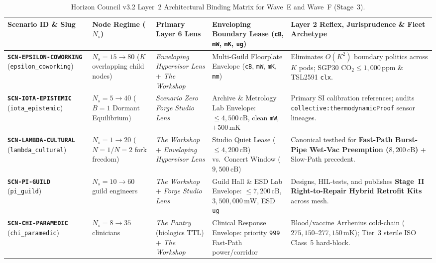 \begin{table}[htbp]
\centering
\caption{Horizon Council v3.2 Layer~2 Architectural Binding Matrix for Wave~E and Wave~F (Stage~3).}
\label{tab:l2-waves-ef-matrix}
\footnotesize
\begin{tabular}{@{}p{2.4cm}p{1.9cm}p{2.8cm}p{3.1cm}p{3.5cm}@{}}
\toprule
\textbf{Scenario ID \& Slug} & \textbf{Node Regime ($N_s$)} & \textbf{Primary Layer 6 Lens} & \textbf{Enveloping Boundary Lease (\texttt{cB}, \texttt{mW}, \texttt{mK}, \texttt{ug})} & \textbf{Layer 2 Reflex, Jurisprudence \& Fleet Archetype} \\
\midrule
\textbf{\texttt{SCN-EPSILON-COWORKING}} (\texttt{epsilon\_coworking}) & $N_s = 15 \to 80$ ($K$ overlapping child nodes) & \textit{Enveloping Hypervisor Lens} + \textit{The Workshop} & Multi-Guild Floorplate Envelope (\texttt{cB}, \texttt{mW}, \texttt{mK}, \texttt{mm}) & Eliminates $O(K^2)$ boundary politics across $K$ pods; SGP30 $\mathrm{CO_2} \le 1{,}000\,\mathrm{ppm}$ \& TSL2591 \texttt{clx}. \\
\addlinespace[2pt]
\textbf{\texttt{SCN-IOTA-EPISTEMIC}} (\texttt{iota\_epistemic}) & $N_s = 5 \to 40$ ($B=1$ Dormant Equilibrium) & \textit{Scenario Zero Forge Studio Lens} & Archive \& Metrology Lab Envelope: $\le 4{,}500\,\mathrm{cB}$, clean \texttt{mW}, $\pm 500\,\mathrm{mK}$ & Primary SI calibration references; audits \texttt{collective:thermodynamicProof} sensor lineages. \\
\addlinespace[2pt]
\textbf{\texttt{SCN-LAMBDA-CULTURAL}} (\texttt{lambda\_cultural}) & $N_s = 1 \to 20$ ($N=1/N=2$ fork freedom) & \textit{The Workshop} + \textit{Enveloping Hypervisor Lens} & Studio Quiet Lease ($\le 4{,}200\,\mathrm{cB}$) vs.\ Concert Window ($9{,}500\,\mathrm{cB}$) & Canonical testbed for \textbf{Fast-Path Burst-Pipe Wet-Vac Preemption ($8{,}200\,\mathrm{cB}$)} + Slow-Path precedent. \\
\addlinespace[2pt]
\textbf{\texttt{SCN-PI-GUILD}} (\texttt{pi\_guild}) & $N_s = 10 \to 60$ guild engineers & \textit{The Workshop} + \textit{Forge Studio Lens} & Guild Hall \& ESD Lab Envelope: $\le 7{,}200\,\mathrm{cB}$, $3{,}500{,}000\,\mathrm{mW}$, ESD \texttt{ug} & Designs, HIL-tests, and publishes \textbf{Stage~II Right-to-Repair Hybrid Retrofit Kits} across mesh. \\
\addlinespace[2pt]
\textbf{\texttt{SCN-CHI-PARAMEDIC}} (\texttt{chi\_paramedic}) & $N_s = 8 \to 35$ clinicians & \textit{The Pantry} (biologics TTL) + \textit{The Workshop} & Clinical Response Envelope: priority \texttt{999} Fast-Path power/corridor & Blood/vaccine Arrhenius cold-chain ($275{,}150\text{--}277{,}150\,\mathrm{mK}$); Tier~3 sterile ISO Class~5 hard-block. \\

\end{tabular}
\end{table}
